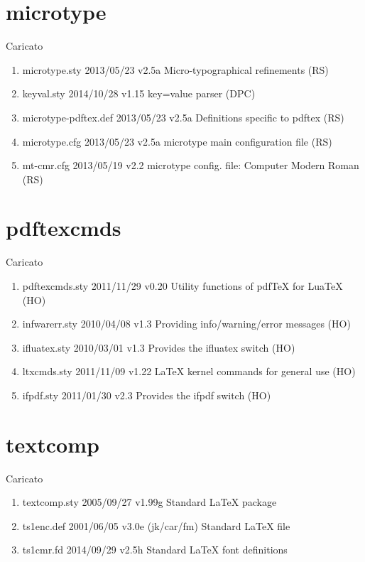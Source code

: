 \section{microtype}	 	 

Caricato 
\begin{enumerate}
\item 	microtype.sty 2013/05/23 v2.5a Micro-typographical refinements (RS)
\item 	keyval.sty 2014/10/28 v1.15 key=value parser (DPC)
\item 	microtype-pdftex.def 2013/05/23 v2.5a Definitions specific to pdftex (RS)
\item 	microtype.cfg 2013/05/23 v2.5a microtype main configuration file (RS)
\item 	mt-cmr.cfg 2013/05/19 v2.2 microtype config. file: Computer Modern Roman (RS)
\end{enumerate}	 
\section{pdftexcmds}	 	 

Caricato 
\begin{enumerate}
\item pdftexcmds.sty 2011/11/29 v0.20 Utility functions of pdfTeX for LuaTeX (HO)
\item infwarerr.sty 2010/04/08 v1.3 Providing info/warning/error messages (HO)
\item ifluatex.sty 2010/03/01 v1.3 Provides the ifluatex switch (HO)
\item ltxcmds.sty 2011/11/09 v1.22 LaTeX kernel commands for general use (HO)
\item ifpdf.sty 2011/01/30 v2.3 Provides the ifpdf switch (HO)
\end{enumerate}		
\section{textcomp}	 	 

Caricato 
\begin{enumerate}
\item 	textcomp.sty 2005/09/27 v1.99g Standard LaTeX package
\item 	ts1enc.def 2001/06/05 v3.0e (jk/car/fm) Standard LaTeX file
\item 	ts1cmr.fd 2014/09/29 v2.5h Standard LaTeX font definitions
\end{enumerate}	 
